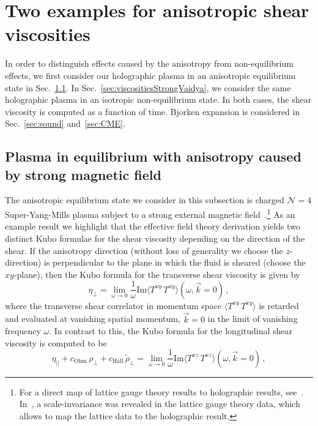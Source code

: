 \documentclass[preprint,12pt]{elsarticle}
\begin{document}
\section{Two examples for anisotropic shear viscosities}
\label{sec:viscosities}
In order to distinguish effects caused by the anisotropy from non-equilibrium effects, we first consider our holographic plasma in an anisotropic equilibrium state in Sec.~\ref{sec:viscositiesStrongB}. In Sec.~\ref{sec:viscositiesStrongVaidya}, we consider the same holographic plasma in an isotropic non-equilibrium state. In both cases, the shear viscosity is computed as a function of time. Bjorken expansion is considered in Sec.~\ref{sec:sound} and~\ref{sec:CME}. 

\subsection{Plasma in equilibrium with anisotropy caused by strong magnetic field}
\label{sec:viscositiesStrongB}
The anisotropic equilibrium state we consider in this subsection is charged $\mathcal{N}=4$ Super-Yang-Mills plasma subject to a strong external magnetic field~\cite{Janiszewski:2015ura,Ammon:2020rvg}.\footnote{For a direct map of lattice gauge theory results to holographic results, see~\cite{Endrodi:2018ikq}. In~\cite{Endrodi:2018ikq}, a scale-invariance was revealed in the lattice gauge theory data, which allows to map the lattice data to the holographic result.} 
%
As an example result we highlight that the effective field theory derivation yields two distinct Kubo formulae for the shear viscosity depending on the direction of the shear. If the anisotropy direction (without loss of generality we choose the $z$-direction) is perpendicular to the plane in which the fluid is sheared (choose the $xy$-plane), then the Kubo formula for the transverse shear viscosity is given by 
\begin{equation}\label{eq:KuboLongitudinalShear}
    \eta_\perp = \lim\limits_{\omega\to 0}\frac{1}{\omega}\mathrm{Im}\langle T^{xy}\, T^{xy} \rangle(\omega, \vec{k}=0) \, ,
\end{equation}
where the transverse shear correlator in momentum space $\langle T^{xy}\, T^{xy}\rangle$ is retarded and evaluated at vanishing spatial momentum, $\vec{k}=0$ in the limit of vanishing frequency $\omega$. In contrast to this, the Kubo formula for the longitudinal shear viscosity is computed to be 
\begin{equation}\label{eq:KuboTransverseShear}
    \eta_{||} + c_\mathrm{Ohm}\,\rho_\perp + c_\mathrm{Hall}\,\tilde\rho_\perp= \lim\limits_{\omega\to 0}\frac{1}{\omega}\mathrm{Im}\langle T^{xz}\, T^{xz} \rangle(\omega, \vec{k}=0) \, ,
\end{equation}
\end{document}
